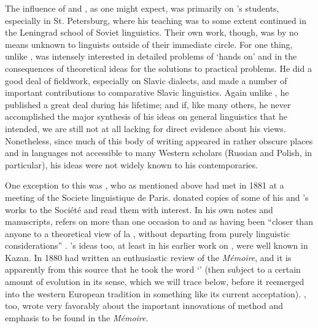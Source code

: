 The influence of {\Baudouin} and {\Kruszewski}, as one might expect, was
primarily on {\Baudouin}'s students, especially in St. Petersburg, where
his teaching was to some extent continued in the Leningrad school of
Soviet linguistics. Their own work, though, was by no means unknown to
linguists outside of their immediate circle. For one thing, unlike
{\Saussure}, {\Baudouin} was intensely interested in detailed problems of
`hands on'  and in the consequences of
theoretical ideas for the solutions to practical problems. He did a
good deal of fieldwork, especially on Slavic dialects, and made a
number of important contributions to comparative Slavic
linguistics. Again unlike {\Saussure}, he published a great deal during
his lifetime; and if, like many others, he never accomplished the
major synthesis of his ideas on general linguistics that he intended,
we are still not at all lacking for direct evidence about his
views. Nonetheless, since much of this body of writing appeared in
rather obscure places and in languages not accessible to many Western
scholars ({Russian} and Polish, in particular), his ideas were not
widely known to his contemporaries.

One exception to this was {\Saussure}, who as mentioned above had met
{\Baudouin} in 1881 at a meeting of the Societe linguistique de
Paris. {\Baudouin} donated copies of some of his and {\Kruszewski}'s works
to the Société and {\Saussure} read them with interest. In his own notes
and manuscripts, {\Saussure} refers on more than one occasion to {\Baudouin}
and {\Kruszewski} as having been ``closer than anyone to a theoretical
view of la , without departing from purely linguistic
considerations'' \citep[51; my
translation]{godel57:sources}. {\Saussure}'s ideas too, at least in his
earlier work on , were well known in Kazan. In 1880
{\Kruszewski} had written an enthusiastic review of the \textsl{Mémoire},
and it is apparently from this source that he took the word `'
(then subject to a certain amount of evolution in its sense, which we
will trace below, before it reemerged into the western European
tradition in something like its current acceptation). {\Baudouin}, too,
wrote very favorably about the important innovations of method and
emphasis to be found in the \textsl{Mémoire}.

